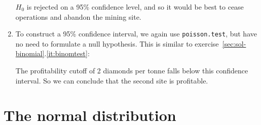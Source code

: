 \begin{enumerate}
$H_0$ is rejected on a 95\% confidence level, and so it would be
best to cease operations and abandon the mining site.

\item To construct a 95\% confidence interval, we again use
  \texttt{poisson.test}, but have no need to formulate a null
  hypothesis. This is similar to
  exercise~\ref{sec:sol-binomial}.\ref{it:binomtest}:


The profitability cutoff of 2 diamonds per tonne falls below this
confidence interval. So we can conclude that the second site is
profitable.

\end{enumerate}

\section{The normal distribution}
\label{sec:sol-gauss}

